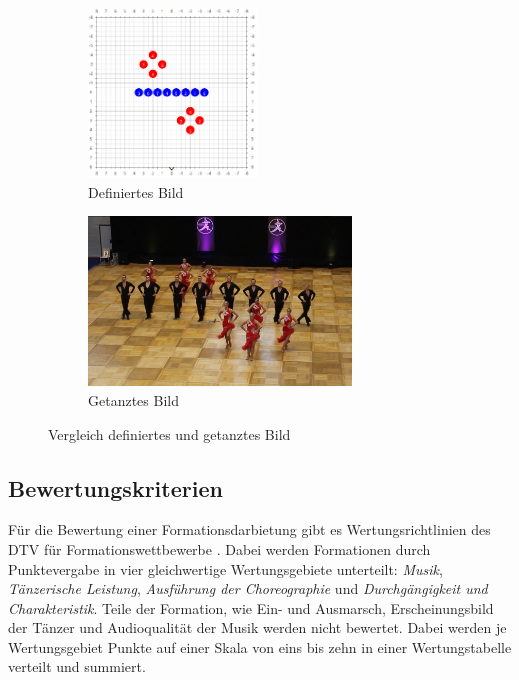 \documentclass[
  ngerman,
  a4paper,  %
  twoside,  %
  bibliography=totoc,
  headsepline,
  cleardoublepage=empty,
  parskip=half,
  draft=false
]{scrbook}
\begin{document}

\begin{figure}
  \begin{subfigure}{.5\textwidth}
    \includegraphics[height=4.5cm]{graphics/definiertes_Bild.png}
    \caption{Definiertes Bild}
    \label{fig:tanzfläche_choreo}
  \end{subfigure}
  \begin{subfigure}{.5\textwidth}
    \includegraphics[height=4.5cm]{graphics/getanztes_bild.png}
    \caption{Getanztes Bild}
  \end{subfigure}
  \caption{Vergleich definiertes und getanztes Bild}
  \label{fig:def_bild}
\end{figure}


\subsection{Bewertungskriterien \label{chp:bewertungskriterien}}
Für die Bewertung einer Formationsdarbietung gibt es Wertungsrichtlinien des DTV für Formationswettbewerbe \cite{wertungsrichtlinien}.
Dabei werden Formationen durch Punktevergabe in vier gleichwertige Wertungsgebiete unterteilt: \textit{Musik}, \textit{Tänzerische Leistung}, \textit{Ausführung der Choreographie} und \textit{Durchgängigkeit und Charakteristik}.
Teile der Formation, wie Ein- und Ausmarsch, Erscheinungsbild der Tänzer und Audioqualität der Musik werden nicht bewertet.
Dabei werden je Wertungsgebiet Punkte auf einer Skala von eins bis zehn in einer Wertungstabelle verteilt und summiert.
\end{document}
